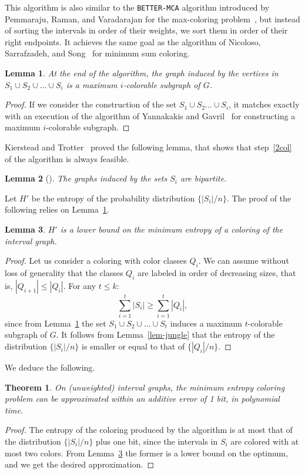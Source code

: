 \documentclass[10pt,a4paper]{article}
\newtheorem{theorem}{Theorem}
\newtheorem{lemma}{Lemma}
\begin{document}
This algorithm is also similar to the {\tt BETTER-MCA} algorithm introduced by Pemmaraju, Raman, and Varadarajan for the max-coloring 
problem~\cite{PRK04}, but instead of sorting the intervals in order of their weights, we sort them in order of their right endpoints. It achieves the same 
goal as the algorithm of Nicoloso, Sarrafzadeh, and Song~\cite{NSS99} for minimum sum coloring.

\begin{lemma}
\label{mics}
At the end of the algorithm, the graph induced by the vertices in $S_1\cup S_2 \cup \ldots \cup S_i$ is a maximum $i$-colorable subgraph of $G$.
\end{lemma}
\begin{proof}
If we consider the construction of the set $S_1\cup S_2\ldots \cup S_i$, 
it matches exactly with an execution of the algorithm of Yannakakis and Gavril~\cite{YG87} for constructing a maximum $i$-colorable subgraph.
\end{proof}

Kierstead and Trotter~\cite{KT} proved the following lemma, that shows that step~\ref{2col} of the algorithm is always feasible. 
\begin{lemma}[\cite{KT}]
\label{2colSi}
The graphs induced by the sets $S_i$ are bipartite.
\end{lemma}

Let $H'$ be the entropy of the probability distribution $\{ |S_i| / n\}$. The proof of the following relies on Lemma~\ref{mics}. 
\begin{lemma}
\label{lem:lb}
$H'$ is a lower bound on the minimum entropy of a coloring of the interval graph.
\end{lemma}
\begin{proof}
Let us consider a coloring with color classes $Q_i$.
We can assume without loss of generality that the classes $Q_i$ are labeled in order of decreasing sizes, that is, $|Q_{i+1}|\leq |Q_i|$. 
For any $t\leq k$:
$$
\sum_{i=1}^t |S_i| \geq \sum_{i=1}^t |Q_i|,
$$
since from Lemma~\ref{mics} the set $S_1\cup S_2\cup\ldots \cup S_t$ induces a maximum $t$-colorable subgraph of $G$.
It follows from Lemma~\ref{lem-jungle} 
that the entropy of the distribution $\{|S_i|/n\}$ is smaller or equal to that of $\{|Q_i|/n\}$.
\end{proof}

We deduce the following.
\begin{theorem}
\label{thm:interv1}
On (unweighted) interval graphs, the minimum entropy coloring problem can be approximated within an additive error of 1 bit, in polynomial time.
\end{theorem}
\begin{proof}
The entropy of the coloring produced by the algorithm is at most that of the distribution $\{ |S_i| / n\}$ plus one bit, since
the intervals in $S_i$ are colored with at most two colors. From Lemma~\ref{lem:lb} the former is a lower bound on the optimum, 
and we get the desired approximation.
\end{proof}
\end{document}
